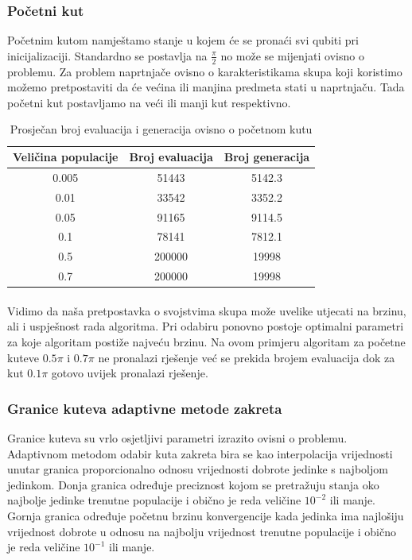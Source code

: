 \documentclass[times, utf8, zavrsni, numeric]{fer}
\begin{document}
\subsubsection{Početni kut}
Početnim kutom namještamo stanje u kojem će se pronaći svi qubiti pri inicijalizaciji. Standardno se postavlja na $\frac{\pi}{2}$ no može se mijenjati ovisno o problemu. Za problem naprtnjače ovisno o karakteristikama skupa koji koristimo možemo pretpostaviti da će većina ili manjina predmeta stati u naprtnjaču. Tada početni kut postavljamo na veći ili manji kut respektivno.

\begin{table}[htb]
\caption{Prosječan broj evaluacija i generacija ovisno o početnom kutu}
\centering
\begin{tabular}{ccc} \hline
Veličina populacije & Broj evaluacija & Broj generacija \\ 
\hline
0.005 &	51443	& 5142.3 \\
0.01 & 	33542 & 	3352.2 \\
0.05 &	 91165 & 	9114.5 \\
0.1 &	78141 &	7812.1 \\
0.5 &	200000 &	19998 \\
0.7 &	200000 &	19998 \\
\hline
\end{tabular}
\end{table}

\paragraph{}
Vidimo da naša pretpostavka o svojstvima skupa može uvelike utjecati na brzinu, ali i uspješnost rada algoritma. Pri odabiru ponovno postoje optimalni parametri za koje algoritam postiže najveću brzinu. Na ovom primjeru algoritam za početne kuteve $0.5 \pi$ i $0.7 \pi$ ne pronalazi rješenje već se prekida brojem evaluacija dok za kut $0.1 \pi$ gotovo uvijek pronalazi rješenje.

\subsubsection{Granice kuteva adaptivne metode zakreta}
Granice kuteva su vrlo osjetljivi parametri izrazito ovisni o problemu. Adaptivnom metodom odabir kuta zakreta bira se kao interpolacija vrijednosti unutar granica proporcionalno odnosu vrijednosti dobrote jedinke s najboljom jedinkom. Donja granica određuje preciznost kojom se pretražuju stanja oko najbolje jedinke trenutne populacije i obično je reda veličine $10^{-2}$ ili manje.  Gornja granica određuje početnu brzinu konvergencije kada jedinka ima najlošiju vrijednost dobrote u odnosu na najbolju vrijednost trenutne populacije i obično je reda veličine $10^{-1}$ ili manje. 
\end{document}
